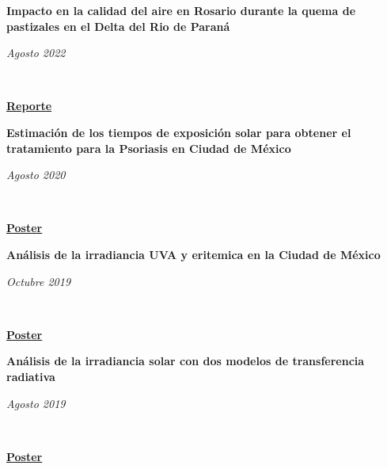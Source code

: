 \documentclass[a3paper]{adcv_color}
\newcommand{\proyect}[3]{\begin{minipage}{1\linewidth}
		\begin{minipage}{0.8\linewidth}
			\textbf{#1}
		\end{minipage}
		\begin{minipage}{0.19\linewidth}
			\begin{flushright}
				\vspace{#3cm}
				\textit{#2}
			\end{flushright}
		\end{minipage}\\
	\end{minipage}
}
\begin{document}
\proyect{Impacto en la calidad del aire en Rosario durante la quema de pastizales en el Delta del Rio de Paraná}{Agosto 2022}{-0.6}
\href{https://rephip.unr.edu.ar/handle/2133/24201}{\textbf{Reporte}}
\vspace{0.05cm}\\



\columnbreak

\proyect{Estimación de los tiempos de exposición solar para obtener el tratamiento para la Psoriasis en Ciudad de México}{Agosto 2020}{-0.2}
\href{https://github.com/giovannilopez9808/Documents/raw/master/Posters/2020/CNF/TES/main.pdf}{\textbf{Poster}}
\vspace{0.05cm}\\



\proyect{Análisis de la irradiancia UVA y eritemica en la Ciudad de México}{Octubre 2019}{-0.2}  \href{https://github.com/giovannilopez9808/Documents/raw/master/Posters/2019/AFA/Analisis%20indice%20UV/Analisis%20de%20irradiancia.pdf}{\textbf{Poster}}
\vspace{0.05cm}\\


\proyect{Análisis de la irradiancia solar con dos modelos de transferencia radiativa}{Agosto 2019}{0}
\href{https://github.com/giovannilopez9808/Documents/raw/master/Posters/2019/CNF/Transferencia%20radiativa/main.pdf}{\textbf{Poster}}
\end{document}
